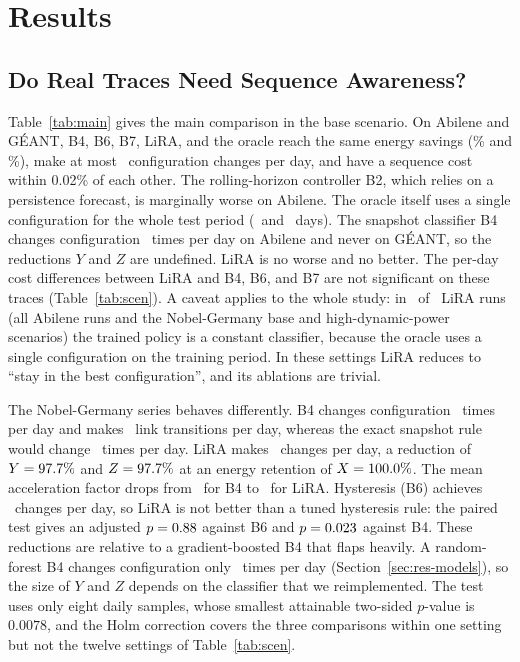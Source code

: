 \documentclass[journal]{IEEEtran}
\begin{document}
\section{Results}\label{sec:results}

\subsection{Do Real Traces Need Sequence Awareness?}\label{sec:res-main}

Table~\ref{tab:main} gives the main comparison in the base scenario. On Abilene and G\'{E}ANT, B4, B6, B7, LiRA, and the oracle reach the same energy savings (\abiSav\% and \geaSav\%), make at most \abiBFourchg\ configuration changes per day, and have a sequence cost within 0.02\% of each other. The rolling-horizon controller B2, which relies on a persistence forecast, is marginally worse on Abilene. The oracle itself uses a single configuration for the whole test period (\abiTestDays\ and \geaTestDays\ days). The snapshot classifier B4 changes configuration \abiBFourchg\ times per day on Abilene and never on G\'{E}ANT, so the reductions $Y$ and $Z$ are undefined. LiRA is no worse and no better. The per-day cost differences between LiRA and B4, B6, and B7 are not significant on these traces (Table~\ref{tab:scen}). A caveat applies to the whole study: in \liraConstRuns\ of \liraTotalRuns\ LiRA runs (all Abilene runs and the Nobel-Germany base and high-dynamic-power scenarios) the trained policy is a constant classifier, because the oracle uses a single configuration on the training period. In these settings LiRA reduces to ``stay in the best configuration'', and its ablations are trivial.

\begin{table}[t]
\centering
\caption{Main Comparison in the Base Scenario (Test Split). Means with 95\% Confidence Intervals over Five Seeds for B4, B6, B7, and LiRA; Single Values Otherwise. Latency Is the Median Decision Time}
\label{tab:main}
\footnotesize
\setlength{\tabcolsep}{4pt}

\end{table}

The Nobel-Germany series behaves differently. B4 changes configuration \nobBFourchg\ times per day and makes \nobBFourtrans\ link transitions per day, whereas the exact snapshot rule would change \nobSnapChg\ times per day. LiRA makes \nobLiRAchg\ changes per day, a reduction of $Y=97.7\%$ and $Z=97.7\%$ at an energy retention of $X=100.0\%$. The mean acceleration factor drops from \nobAFfour\ for B4 to \nobAFlira\ for LiRA. Hysteresis (B6) achieves \nobBsixChg\ changes per day, so LiRA is not better than a tuned hysteresis rule: the paired test gives an adjusted $p=0.88$ against B6 and $p=0.023$ against B4. These reductions are relative to a gradient-boosted B4 that flaps heavily. A random-forest B4 changes configuration only \modRfChg\ times per day (Section~\ref{sec:res-models}), so the size of $Y$ and $Z$ depends on the classifier that we reimplemented. The test uses only eight daily samples, whose smallest attainable two-sided $p$-value is $0.0078$, and the Holm correction covers the three comparisons within one setting but not the twelve settings of Table~\ref{tab:scen}.
\end{document}

